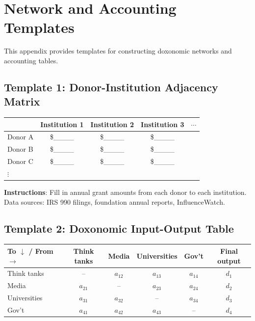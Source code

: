 \chapter{Network and Accounting Templates}
\label{app:templates}

This appendix provides templates for constructing doxonomic networks and accounting tables.

\section*{Template 1: Donor-Institution Adjacency Matrix}

\begin{center}
\begin{tabular}{l|cccc}
\toprule
 & Institution 1 & Institution 2 & Institution 3 & $\cdots$ \\
\midrule
Donor A & \$\_\_\_\_ & \$\_\_\_\_ & \$\_\_\_\_ & \\
Donor B & \$\_\_\_\_ & \$\_\_\_\_ & \$\_\_\_\_ & \\
Donor C & \$\_\_\_\_ & \$\_\_\_\_ & \$\_\_\_\_ & \\
$\vdots$ & & & & \\
\bottomrule
\end{tabular}
\end{center}

\textbf{Instructions}: Fill in annual grant amounts from each donor to each institution. Data sources: IRS 990 filings, foundation annual reports, InfluenceWatch.

\section*{Template 2: Doxonomic Input-Output Table}

\begin{center}
\begin{tabular}{l|cccc|c}
\toprule
\textbf{To $\downarrow$ / From $\to$} & Think tanks & Media & Universities & Gov't & Final output \\
\midrule
Think tanks & -- & $a_{12}$ & $a_{13}$ & $a_{14}$ & $d_1$ \\
Media & $a_{21}$ & -- & $a_{23}$ & $a_{24}$ & $d_2$ \\
Universities & $a_{31}$ & $a_{32}$ & -- & $a_{34}$ & $d_3$ \\
Gov't & $a_{41}$ & $a_{42}$ & $a_{43}$ & -- & $d_4$ \\
\bottomrule
\end{tabular}
\end{center}

